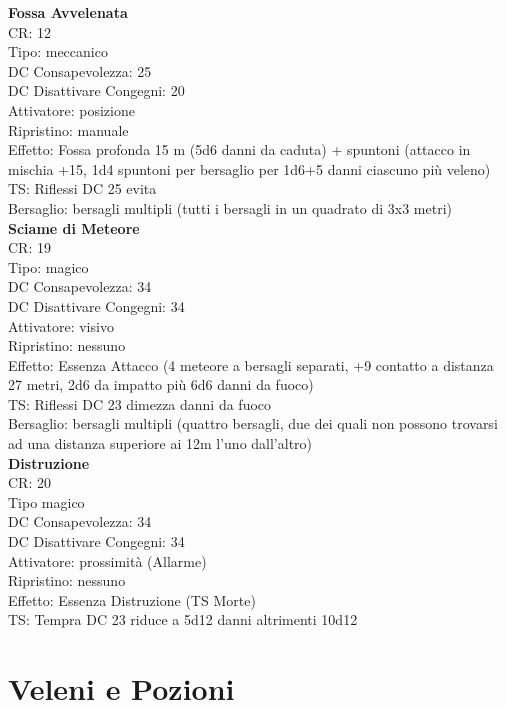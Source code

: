 \documentclass[a4paper,11pt,twoside,openany]{book}
\begin{document}
{\begin{multicols}{2}
\textbf{Fossa Avvelenata}\\
CR: 12 \\
Tipo: meccanico \\
DC Consapevolezza: 25 \\
DC Disattivare Congegni: 20 \\
Attivatore: posizione \\
Ripristino: manuale \\
Effetto: Fossa profonda 15 m (5d6 danni da caduta) + spuntoni (attacco in mischia +15, 1d4 spuntoni per bersaglio per 1d6+5 danni ciascuno più veleno)\\
TS: Riflessi DC 25 evita \\
Bersaglio: bersagli multipli (tutti i bersagli in un quadrato di 3x3 metri)\\

\textbf{Sciame di Meteore}\\
CR: 19 \\
Tipo: magico \\
DC Consapevolezza: 34 \\
DC Disattivare Congegni: 34 \\
Attivatore: visivo\\
Ripristino: nessuno \\
Effetto: Essenza Attacco (4 meteore a bersagli separati, +9 contatto a distanza 27 metri, 2d6 da impatto più 6d6 danni da fuoco)\\
TS: Riflessi DC 23 dimezza danni da fuoco\\
Bersaglio: bersagli multipli (quattro bersagli, due dei quali non possono trovarsi ad una distanza superiore ai 12m l’uno dall’altro)\\

\textbf{Distruzione}\\
CR: 20 \\
Tipo magico \\
DC Consapevolezza: 34 \\
DC Disattivare Congegni: 34 \\
Attivatore: prossimità (Allarme) \\
Ripristino: nessuno \\
Effetto: Essenza Distruzione (TS Morte)\\
TS: Tempra DC 23 riduce a 5d12 danni altrimenti 10d12\\

\end{multicols}

\pagebreak


\section{Veleni e Pozioni}

}
\end{document}
